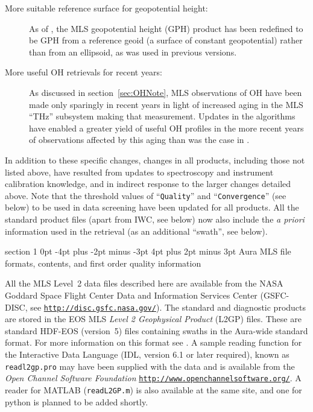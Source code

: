 \documentclass[11pt,draft]{report}
\makeatletter
\renewcommand{\section}{\@startsection%
  {section}%
  {1}%
  {0pt}%
  {-4pt plus -2pt minus -3pt}%
  {4pt plus 2pt minus 3pt}%
  {\Large\sffamily\fontseries{sb}\selectfont\flushleft\color{SectionColor}\figureversion{tabular}}}%
\makeatother
\begin{document}
\begin{description}
\item[More suitable reference surface for geopotential height:] As of
  \thisv, the MLS geopotential height (GPH) product has been redefined
  to be GPH from a reference geoid (a surface of constant geopotential)
  rather than from an ellipsoid, as was used in previous versions.

\item[More useful OH retrievals for recent years:] As discussed in
  section~\ref{sec:OHNote}, MLS observations of OH have been made only
  sparingly in recent years in light of increased aging in the MLS
  ``THz'' subsystem making that measurement.  Updates in the \thisv
  algorithms have enabled a greater yield of useful OH profiles in the
  more recent years of observations affected by this aging than was the
  case in \prevv.
\end{description}

In addition to these specific changes, changes in all products,
including those not listed above, have resulted from updates to
spectroscopy and instrument calibration knowledge, and in indirect
response to the larger changes detailed above.  Note that the threshold
values of ``\texttt{Quality}'' and ``\texttt{Convergence}'' (see below)
to be used in data screening have been updated for all products.  All
the standard product files (apart from IWC, see below) now also include
the \emph{a priori} information used in the retrieval (as an additional
``swath'', see below).

\section{Aura MLS file formats, contents, and first order
  quality information}
\label{sec:FilesAndFormats}
\label{sec:NegativePrecision}

All the MLS Level~2 data files described here are available from the
NASA Goddard Space Flight Center Data and Information Services Center
(GSFC-DISC, see
\href{http://disc.gsfc.nasa.gov/}{\texttt{http://disc.gsfc.nasa.gov/}}).
The standard and diagnostic products are stored in the EOS MLS
\emph{Level 2 Geophysical Product} (L2GP) files.  These are standard
HDF-EOS (version~5) files containing swaths in the Aura-wide standard
format.  For more information on this format see
\citet{AuraFileConventions}.  A sample reading function for the
Interactive Data Language (IDL, version 6.1 or later required), known as
\texttt{readl2gp.pro} may have been supplied with the data and is
available from the \emph{Open Channel Software Foundation}
\href{http://www.openchannelsoftware.org/}{\texttt{http://www.openchannelsoftware.org/}}.
A reader for MATLAB (\texttt{readL2GP.m}) is also available at the same
site, and one for python is planned to be added shortly.
\end{document}
